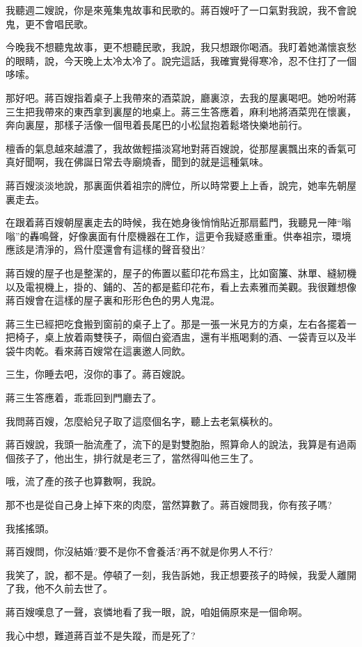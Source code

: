 \documentclass[a6paper]{article}
\begin{document}
我聽週二嫂說，你是來蒐集鬼故事和民歌的。蔣百嫂吁了一口氣對我說，我不會說鬼，更不會唱民歌。

今晚我不想聽鬼故事，更不想聽民歌，我說，我只想跟你喝酒。我盯着她滿懷哀愁的眼睛，說，今天晚上太冷太冷了。說完這話，我確實覺得寒冷，忍不住打了一個哆嗦。

那好吧。蔣百嫂指着桌子上我帶來的酒菜說，廳裏涼，去我的屋裏喝吧。她吩咐蔣三生把我帶來的東西拿到裏屋的地桌上。蔣三生答應着，麻利地將酒菜兜在懷裏，奔向裏屋，那樣子活像一個甩着長尾巴的小松鼠抱着鬆塔快樂地前行。

檀香的氣息越來越濃了，我故做輕描淡寫地對蔣百嫂說，從那屋裏飄出來的香氣可真好聞啊，我在佛誕日常去寺廟燒香，聞到的就是這種氣味。

蔣百嫂淡淡地說，那裏面供着祖宗的牌位，所以時常要上上香，說完，她率先朝屋裏走去。

在跟着蔣百嫂朝屋裏走去的時候，我在她身後悄悄貼近那扇藍門，我聽見一陣“嗡嗡”的轟鳴聲，好像裏面有什麼機器在工作，這更令我疑惑重重。供奉祖宗，環境應該是清淨的，爲什麼還會有這樣的聲音發出?

蔣百嫂的屋子也是整潔的，屋子的佈置以藍印花布爲主，比如窗簾、牀單、縫紉機以及電視機上，掛的、鋪的、苫的都是藍印花布，看上去素雅而美觀。我很難想像蔣百嫂會在這樣的屋子裏和形形色色的男人鬼混。

蔣三生已經把吃食搬到窗前的桌子上了。那是一張一米見方的方桌，左右各擺着一把椅子，桌上放着兩雙筷子，兩個白瓷酒盅，還有半瓶喝剩的酒、一袋青豆以及半袋牛肉乾。看來蔣百嫂常在這裏邀人同飲。

三生，你睡去吧，沒你的事了。蔣百嫂說。

蔣三生答應着，乖乖回到門廳去了。

我問蔣百嫂，怎麼給兒子取了這麼個名字，聽上去老氣橫秋的。

蔣百嫂說，我頭一胎流產了，流下的是對雙胞胎，照算命人的說法，我算是有過兩個孩子了，他出生，排行就是老三了，當然得叫他三生了。

哦，流了產的孩子也算數啊，我說。

那不也是從自己身上掉下來的肉麼，當然算數了。蔣百嫂問我，你有孩子嗎?

我搖搖頭。

蔣百嫂問，你沒結婚?要不是你不會養活?再不就是你男人不行?

我笑了，說，都不是。停頓了一刻，我告訴她，我正想要孩子的時候，我愛人離開了我，他不久前去世了。

蔣百嫂嘆息了一聲，哀憐地看了我一眼，說，咱姐倆原來是一個命啊。

我心中想，難道蔣百並不是失蹤，而是死了?
\end{document}
